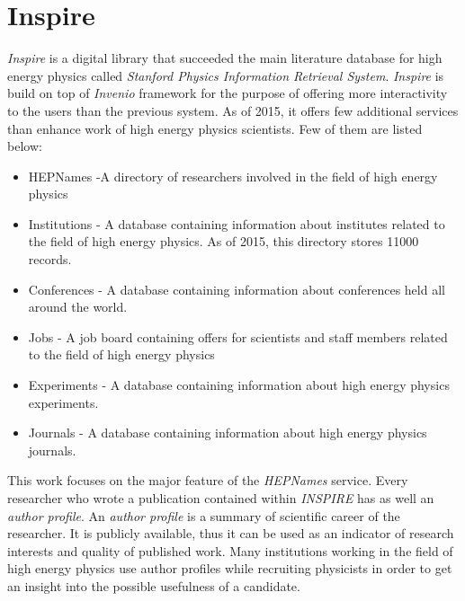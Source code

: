 \documentclass{pracamgr}
\begin{document}
\section{Inspire}\label{inspire}
\textit{Inspire} is a digital library that succeeded the main literature database for high energy physics called \textit{Stanford Physics Information Retrieval System}. \textit{Inspire} is build on top of \textit{Invenio} framework for the purpose of offering more interactivity to the users than the previous system. As of 2015, it offers few additional services than enhance work of high energy physics scientists. Few of them are listed below:

\begin{itemize}
\item HEPNames -A directory of researchers involved in the field of high energy physics
\item Institutions - A database containing information about institutes related to the field of high energy physics. As of 2015, this directory stores 11000 records.
\item Conferences - A database containing information about conferences held all around the world.
\item Jobs - A job board containing offers for scientists and staff members related to the field of high energy physics
\item Experiments - A database containing information about high energy physics experiments.
\item Journals - A database containing information about high energy physics journals.
\end{itemize}

This work focuses on the major feature of the \textit{HEPNames} service. Every researcher who wrote a publication contained within \textit{INSPIRE} has as well an \textit{author profile}. An \textit{author profile} is a summary of scientific career of the researcher. It is publicly available, thus it can be used as an indicator of research interests and quality of published work. Many institutions working in the field of high energy physics use author profiles while recruiting physicists in order to get an insight into the possible usefulness of a candidate. \\
\end{document}
